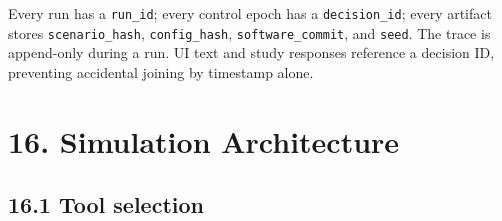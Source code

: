 \documentclass[
  english,
  11pt,
  a4paper,
]{article}
\begin{document}
Every run has a \texttt{run\_id}; every control epoch has a
\texttt{decision\_id}; every artifact stores \texttt{scenario\_hash},
\texttt{config\_hash}, \texttt{software\_commit}, and \texttt{seed}. The
trace is append-only during a run. UI text and study responses reference
a decision ID, preventing accidental joining by timestamp alone.

\section{16. Simulation Architecture}\label{simulation-architecture}

\subsection{16.1 Tool selection}\label{tool-selection}
\end{document}
